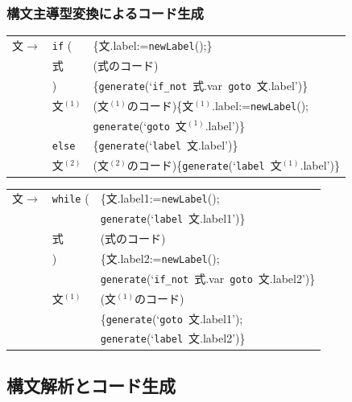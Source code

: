 \documentclass[dvipdfmx]{beamer}
\newcommand{\makenewlabel}{{\tt newLabel}()}
\newcommand{\genlabel}[1]{{\tt generate}(`{\tt label}\ {#1}')}
\newcommand{\genifnot}[2]{{\tt generate}(`{\tt if\_not}\ {#1}\ {\tt goto}\ {#2}')}
\newcommand{\gengoto}[1]{{\tt generate}(`{\tt goto}\ {#1}')}
\begin{document}
\begin{frame}
  \frametitle{構文主導型変換によるコード生成}
  {\small
    \begin{tabular}{lll}
      文$\rightarrow$ & {\tt if} (  & \{文.label:=\makenewlabel;\}                      \\
                     & 式           & (式のコード)                                          \\
                     & )           & \{\genifnot{式.var}{文.label}\}                    \\
                     & 文$^{(1)}$   & (文$^{(1)}$のコード)\{文$^{(1)}$.label:=\makenewlabel; \\
                     &             & \gengoto{文$^{(1)}$.label}\}                      \\
                     & {\tt else}  & \{\genlabel{文.label}\}                           \\
                     & 文$^{(2)}$   & (文$^{(2)}$のコード)\{\genlabel{文$^{(1)}$.label}\}
    \end{tabular}

    \vspace*{1zw}

    \begin{tabular}{lll}
      文$\rightarrow$ & {\tt while} ( & \{文.label1:=\makenewlabel;   \\
                     &               & \genlabel{文.label1}\}        \\
                     & 式             & (式のコード)                      \\
                     & )             & \{文.label2:=\makenewlabel;   \\
                     &               & \genifnot{式.var}{文.label2}\} \\
                     & 文$^{(1)}$     & (文$^{(1)}$のコード)             \\
                     &               & \{\gengoto{文.label1};        \\
                     &               & \genlabel{文.label2}\}        \\
    \end{tabular}
  }
\end{frame}

\subsection{構文解析とコード生成}
\end{document}
